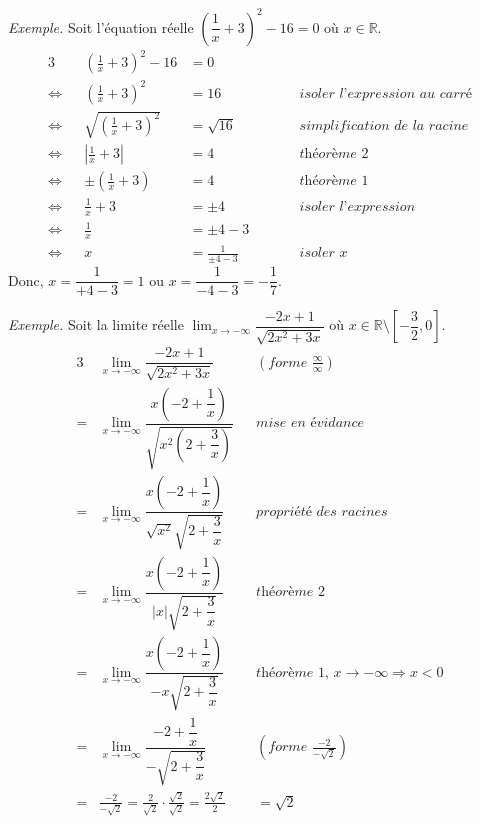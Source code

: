 \documentclass[11pt]{article}
\newenvironment{exemple}
{\noindent\textit{Exemple. }}
{}
\begin{document}
\begin{exemple}
Soit l'équation réelle $\left(\dfrac{1}{x}+3\right)^2-16=0$ où $x\in\mathbb{R}$.
\begin{alignat*}{3}
                & &     \left(\frac{1}{x}+3\right)^2-16&=0                 & &\\
\Leftrightarrow & &        \left(\frac{1}{x}+3\right)^2&=16                & &\quad\quad\textit{isoler l'expression au carré}\\
\Leftrightarrow & & \sqrt{\left(\frac{1}{x}+3\right)^2}&=\sqrt{16}         & &\quad\quad\textit{simplification de la racine}\\
\Leftrightarrow & &          \left|\frac{1}{x}+3\right|&=4                 & &\quad\quad\textit{théorème 2}\\
\Leftrightarrow & &       \pm\left(\frac{1}{x}+3\right)&=4                 & &\quad\quad\textit{théorème 1}\\
\Leftrightarrow & &                       \frac{1}{x}+3&=\pm 4             & &\quad\quad\textit{isoler l'expression}\\
\Leftrightarrow & &                         \frac{1}{x}&=\pm 4-3           & &\\
\Leftrightarrow & &                                   x&=\frac{1}{\pm 4-3} & &\quad\quad\textit{isoler $x$}
\end{alignat*}
Donc, $x=\dfrac{1}{+4-3}=1$ ou $x=\dfrac{1}{-4-3}=-\dfrac{1}{7}$.
\end{exemple}\pagebreak

\begin{exemple}
Soit la limite réelle $\lim_{x\rightarrow-\infty}\dfrac{-2x+1}{\sqrt{2x^2+3x}}$ où $x\in\mathbb{R}\setminus\left[-\dfrac{3}{2},0\right]$.
\begin{alignat*}{3}
   &\lim_{x\rightarrow-\infty}\dfrac{-2x+1}{\sqrt{2x^2+3x}}
&&\textit{$\left(forme\,\,\frac{\infty}{\infty}\right)$}\\
  =&\lim_{x\rightarrow-\infty}\dfrac{x\left(-2+\dfrac{1}{x}\right)}{\sqrt{x^2\left(2+\dfrac{3}{x}\right)}}
&&\textit{mise en évidance}\\
  =&\lim_{x\rightarrow-\infty}\dfrac{x\left(-2+\dfrac{1}{x}\right)}{\sqrt{x^2}\sqrt{2+\dfrac{3}{x}}}
&&\textit{propriété des racines}\\
  =&\lim_{x\rightarrow-\infty}\dfrac{x\left(-2+\dfrac{1}{x}\right)}{|x|\sqrt{2+\dfrac{3}{x}}}
&&\textit{théorème 2}\\
  =&\lim_{x\rightarrow-\infty}\dfrac{x\left(-2+\dfrac{1}{x}\right)}{-x\sqrt{2+\dfrac{3}{x}}}
&&\textit{théorème 1, $x\rightarrow-\infty\Rightarrow x<0$}\\
  =&\lim_{x\rightarrow-\infty}\dfrac{-2+\dfrac{1}{x}}{-\sqrt{2+\dfrac{3}{x}}}
&&\textit{$\left(forme\,\,\frac{-2}{-\sqrt{2}}\right)$}\\
  =&\frac{-2}{-\sqrt{2}}=\frac{2}{\sqrt{2}}\cdot\frac{\sqrt{2}}{\sqrt{2}}=\frac{2\sqrt{2}}{2}&&=\sqrt{2}\\
\end{alignat*}
\end{exemple}\pagebreak
\end{document}
